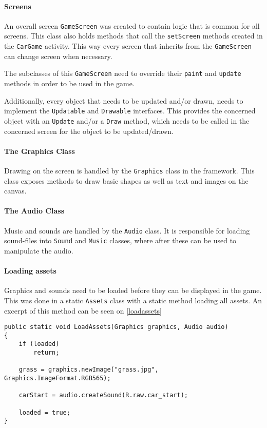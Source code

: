 \paragraph{Screens}
An overall screen \lstinline|GameScreen| was created to contain logic that is common for all screens.
This class also holds methods that call the \lstinline|setScreen| methods created in the \lstinline|CarGame| activity.
This way every screen that inherits from the \lstinline|GameScreen| can change screen when necessary.

The subclasses of this \lstinline|GameScreen| need to override their \lstinline|paint| and \lstinline|update| methods in order to be used in the game.

Additionally, every object that needs to be updated and/or drawn, needs to implement the \lstinline|Updatable| and \lstinline|Drawable| interfaces.
This provides the concerned object with an \lstinline|Update| and/or a \lstinline|Draw| method, which needs to be called in the concerned screen for the object to be updated/drawn.

\paragraph{The Graphics Class}
Drawing on the screen is handled by the \lstinline|Graphics| class in the framework.
This class exposes methods to draw basic shapes as well as text and images on the canvas. 

\paragraph{The Audio Class}
Music and sounds are handled by the \lstinline|Audio| class.
It is responsible for loading sound-files into \lstinline|Sound| and \lstinline|Music| classes, where after these can be used to manipulate the audio.

\paragraph{Loading assets}
Graphics and sounds need to be loaded before they can be displayed in the game. 
This was done in a static \lstinline|Assets| class with a static method loading all assets.
An excerpt of this method can be seen on \cref{loadassets}

\begin{lstlisting}[caption=The LoadAssets method, label=loadassets]
public static void LoadAssets(Graphics graphics, Audio audio) 
{
	if (loaded)
		return;

	grass = graphics.newImage("grass.jpg", Graphics.ImageFormat.RGB565);
	
	carStart = audio.createSound(R.raw.car_start);
	
	loaded = true;
}
\end{lstlisting}


